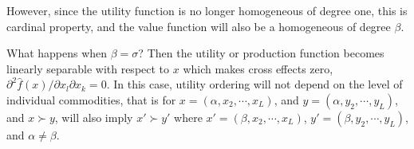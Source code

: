 However, since the utility function is no longer homogeneous of degree one, this is cardinal property, and the value function will also be a homogeneous of degree $\beta$.

What happens when $\beta = \sigma$? Then the utility or production function becomes linearly separable with respect to $x$ which makes cross effects zero, $\partial^2 \hat{f}(x) / \partial x_l \partial x_k =0 $. In this case, utility ordering will not depend on the level of individual commodities, that is for $x = (\alpha, x_2, \cdots, x_L)$, and $y = (\alpha, y_2, \cdots, y_L)$, and $x \succ y$, will also imply $x' \succ y'$ where $x' = (\beta, x_2, \cdots, x_L)$, $y' = (\beta, y_2, \cdots, y_L)$, and $\alpha \neq \beta$.
